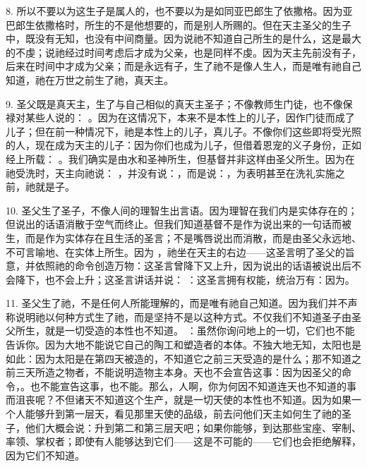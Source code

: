 8. 所以不要以为这生子是属人的，也不要以为是如同亚巴郎生了依撒格。因为亚巴郎生依撒格时，所生的不是他想要的，而是别人所赐的。但在天主圣父的生子中，既没有无知，也没有中间商量。因为说祂不知道自己所生的是什么，这是最大的不虔；说祂经过时间考虑后才成为父亲，也是同样不虔。因为天主先前没有子，后来在时间中才成为父亲；而是永远有子，生了祂不是像人生人，而是唯有祂自己知道，祂在万世之前生了祂，真天主。\par

9. 圣父既是真天主，生了与自己相似的真天主圣子；不像教师生门徒，也不像保禄对某些人说的： 。因为在这情况下，本来不是本性上的儿子，因作门徒而成了儿子；但在前一种情况下，祂是本性上的儿子，真儿子。不像你们这些即将受光照的人，现在成为天主的儿子：因为你们也成为儿子，但借着恩宠的义子身份，正如经上所载： 。我们确实是由水和圣神所生，但基督并非这样由圣父所生。因为在祂受洗时，天主向祂说： ，并没有说：，而是说：，为表明甚至在洗礼实施之前，祂就是子。\par

10. 圣父生了圣子，不像人间的理智生出言语。因为理智在我们内是实体存在的；但说出的话语消散于空气而终止。但我们知道基督不是作为说出来的一句话而被生，而是作为实体存在且生活的圣言；不是嘴唇说出而消散，而是由圣父永远地、不可言喻地、在实体上所生。因为 ，祂坐在天主的右边——这圣言明了圣父的旨意，并依照祂的命令创造万物：这圣言曾降下又上升，因为说出的话语被说出后不会降下，也不会上升；这圣言讲话并说： ：这圣言拥有权能，统治万有：因为。\par

11. 圣父生了祂，不是任何人所能理解的，而是唯有祂自己知道。因为我们并不声称说明祂以何种方式生了祂，而是坚持不是以这种方式。不仅我们不知道圣子由圣父所生，就是一切受造的本性也不知道。 ：虽然你询问地上的一切，它们也不能告诉你。因为大地不能说它自己的陶工和塑造者的本体。不独大地无知，太阳也是如此：因为太阳是在第四天被造的，不知道它之前三天受造的是什么；那不知道之前三天所造之物者，不能说明造物主本身。天也不会宣告这事：因为因圣父的命令，。也不能宣告这事，也不能。那么，人啊，你为何因不知道连天也不知道的事而沮丧呢？不但诸天不知道这个生产，就是一切天使的本性也不知道。因为如果一个人能够升到第一层天，看见那里天使的品级，前去问他们天主如何生了祂的圣子，他们大概会说：升到第二和第三层天吧；如果你能够，到达那些宝座、宰制、率领、掌权者；即使有人能够达到它们——这是不可能的——它们也会拒绝解释，因为它们不知道。\par

